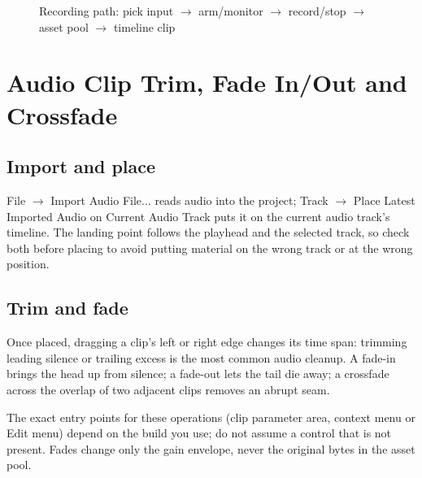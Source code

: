 \begin{figure}[htbp]
\centering
{}
\caption{Recording path: pick input $\to$ arm/monitor $\to$ record/stop $\to$ asset pool $\to$ timeline clip}
\label{fig:ch05-record-flow}
\end{figure}

\section{Audio Clip Trim, Fade In/Out and Crossfade}

\subsection{Import and place}

File $\to$ Import Audio File... reads audio into the project; Track $\to$ Place Latest
Imported Audio on Current Audio Track puts it on the current audio track's timeline.
The landing point follows the playhead and the selected track, so check both before
placing to avoid putting material on the wrong track or at the wrong position.

\subsection{Trim and fade}

Once placed, dragging a clip's left or right edge changes its time span: trimming
leading silence or trailing excess is the most common audio cleanup. A fade-in brings
the head up from silence; a fade-out lets the tail die away; a crossfade across the
overlap of two adjacent clips removes an abrupt seam.

The exact entry points for these operations (clip parameter area, context menu or
Edit menu) depend on the build you use; do not assume a control that is not present.
Fades change only the gain envelope, never the original bytes in the asset pool.



